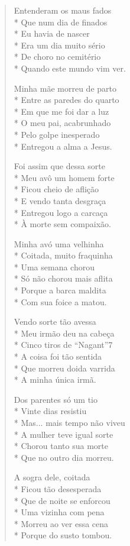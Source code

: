 \begin{verse}
Entenderam os maus fados\\*
Que num dia de finados\\*
Eu havia de nascer\\*
Era um dia muito sério\\*
De choro no cemitério\\*
Quando este mundo vim ver.

Minha mãe morreu de parto\\*
Entre as paredes do quarto\\*
Em que me foi dar a luz\\*
O meu pai, acabrunhado\\*
Pelo golpe inesperado\\*
Entregou a alma a Jesus.

Foi assim que dessa sorte\\*
Meu avô um homem forte\\*
Ficou cheio de aflição\\*
E vendo tanta desgraça\\*
Entregou logo a carcaça\\*
À morte sem compaixão.

Minha avó uma velhinha\\*
Coitada, muito fraquinha\\*
Uma semana chorou\\*
Só não chorou mais aflita\\*
Porque a barca  maldita\\*
Com sua foice a matou.

Vendo sorte tão avessa\\*
Meu irmão deu na cabeça\\*
Cinco tiros de “Nagant”7 \\*
A coisa foi tão sentida\\*
Que morreu doida varrida\\*
A minha única irmã.

Dos parentes só um tio\\*
Vinte dias resistiu\\*
Mas... mais tempo não viveu\\*
A mulher teve igual sorte\\*
Chorou tanto sua morte\\*
Que no outro dia morreu.

A sogra dele, coitada\\*
Ficou tão desesperada\\*
Que de noite se enforcou\\*
Uma vizinha com pena\\*
Morreu ao ver essa cena\\*
Porque do susto tombou.


\end{verse}
